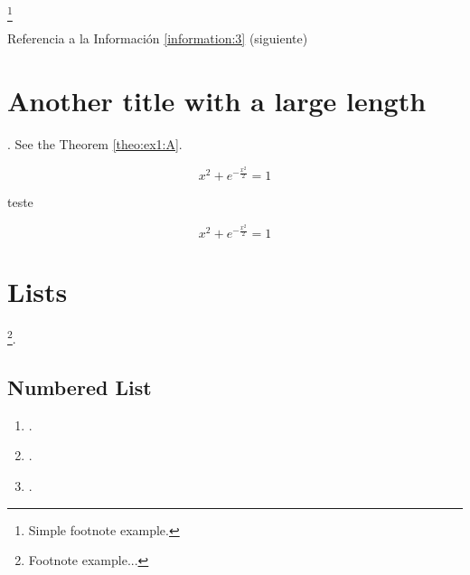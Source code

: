 \lipsum[1] %

\begin{attentionbox}
\label{attentionbox:a}
\lipsum[1][1-3]\footnote{Simple footnote example.}
\end{attentionbox}

\lipsum[1] %

Referencia a la Información \ref{information:3} (siguiente)

\begin{elaboration}[Título C]
\label{information:3}
\lipsum[1][1-3] 
\end{elaboration}

\lipsum[1] %

\section{Another title with a large length}

\lipsum[1]. See the Theorem \ref{theo:ex1:A}.

\begin{theorem}
\label{theo:ex1:A}
\lipsum[1][1-3]
\begin{equation}
x^2+e^{-\frac{x^2}{2}}=1
\end{equation}
\end{theorem}

teste

\begin{proofraw}
\lipsum[1][1-3]
\begin{equation}
x^2+e^{-\frac{x^2}{2}}=1
\end{equation}
\end{proofraw}
\section{Lists}

\lipsum[1][1-3]\footnote{Footnote example...}.

\subsection{Numbered List}

\begin{enumerate}
\item \lipsum[1][1-3].
\item \lipsum[1][1-3].
\item \lipsum[1][1-3].
\end{enumerate}

